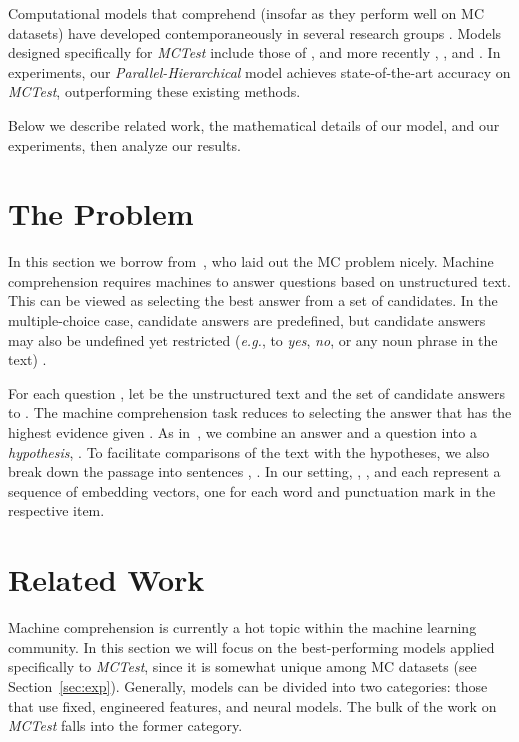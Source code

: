 \documentclass[11pt]{article}
\begin{document}
Computational models that comprehend (insofar as they perform well on MC datasets) have developed contemporaneously in several research groups \cite{weston2014,sukhbaatar2015,hill2015,hermann2015,kumar2015}. Models designed specifically for {\it MCTest} include those of , and more recently , , and . In experiments, our {\it Parallel-Hierarchical} model achieves state-of-the-art accuracy on {\it MCTest}, outperforming these existing methods.

Below we describe related work, the mathematical details of our model, and our experiments, then analyze our results.

\section{The Problem}
In this section we borrow from~, who laid out the MC problem nicely. Machine comprehension requires machines to answer questions based on unstructured text. This can be viewed as selecting the best answer from a set of candidates. In the multiple-choice case, candidate answers are predefined, but candidate answers may also be undefined yet restricted ({\it e.g.}, to \textsl{yes}, \textsl{no}, or any noun phrase in the text) \cite{sachan2015}.

For each question , let  be the unstructured text and  the set of candidate answers to . The machine comprehension task reduces to selecting the answer that has the highest evidence given . As in~, we combine an answer and a question into a {\it hypothesis}, . To facilitate comparisons of the text with the hypotheses, we also break down the passage into sentences , . In our setting, , , and  each represent a sequence of embedding vectors, one for each word and punctuation mark in the respective item.

\section{Related Work}
\label{sec:relwork}
Machine comprehension is currently a hot topic within the machine learning community. In this section we will focus on the best-performing models applied specifically to {\it MCTest}, since it is somewhat unique among MC datasets (see Section~\ref{sec:exp}). Generally, models can be divided into two categories: those that use fixed, engineered features, and neural models. The bulk of the work on {\it MCTest} falls into the former category.
\end{document}

